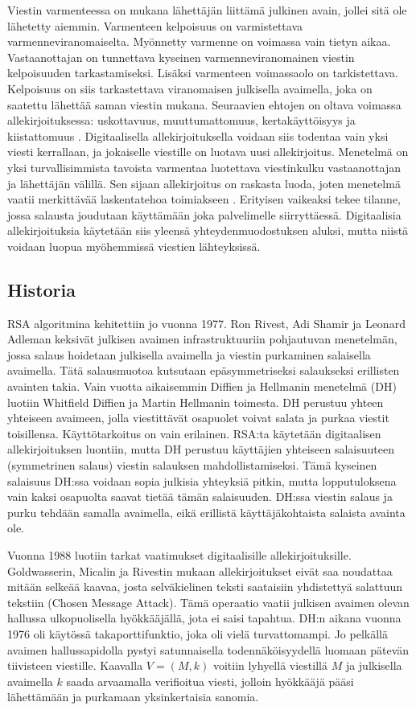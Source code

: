 \documentclass[finnish]{tktltiki2}
\theoremstyle{definition}
\theoremstyle{remark}
\begin{document}
Viestin varmenteessa on mukana lähettäjän liittämä julkinen avain, jollei sitä ole lähetetty aiemmin. Varmenteen kelpoisuus on varmistettava varmenneviranomaiselta. Myönnetty varmenne on voimassa vain tietyn aikaa. Vastaanottajan on tunnettava kyseinen varmenneviranomainen viestin kelpoisuuden tarkastamiseksi. Lisäksi varmenteen voimassaolo on tarkistettava. Kelpoisuus on siis tarkastettava viranomaisen julkisella avaimella, joka on saatettu lähettää saman viestin mukana. Seuraavien ehtojen on oltava voimassa allekirjoituksessa: uskottavuus, muuttumattomuus, kertakäyttöisyys ja kiistattomuus \cite{e-c}. Digitaalisella allekirjoituksella voidaan siis todentaa vain yksi viesti kerrallaan, ja jokaiselle viestille on luotava uusi allekirjoitus. Menetelmä on yksi turvallisimmista tavoista varmentaa luotettava viestinkulku vastaanottajan ja lähettäjän välillä. Sen sijaan allekirjoitus on raskasta luoda, joten menetelmä vaatii merkittävää laskentatehoa toimiakseen \cite{proxy}. Erityisen vaikeaksi tekee tilanne, jossa salausta joudutaan käyttämään joka palvelimelle siirryttäessä. Digitaalisia allekirjoituksia käytetään siis yleensä yhteydenmuodostuksen aluksi, mutta niistä voidaan luopua myöhemmissä viestien lähteyksissä.

\subsection{Historia}

RSA algoritmina kehitettiin jo vuonna 1977. Ron Rivest, Adi Shamir ja Leonard Adleman \cite{siam} keksivät julkisen avaimen infrastruktuuriin pohjautuvan menetelmän, jossa salaus hoidetaan julkisella avaimella ja viestin purkaminen salaisella avaimella. Tätä salausmuotoa kutsutaan epäsymmetriseksi salaukseksi erillisten avainten takia. Vain vuotta aikaisemmin Diffien ja Hellmanin menetelmä (DH) luotiin Whitfield Diffien ja Martin Hellmanin toimesta. DH perustuu yhteen yhteiseen avaimeen, jolla viestittävät osapuolet voivat salata ja purkaa viestit toisillensa. Käyttötarkoitus on vain erilainen. RSA:ta käytetään digitaalisen allekirjoituksen luontiin, mutta DH perustuu käyttäjien yhteiseen salaisuuteen (symmetrinen salaus) viestin salauksen mahdollistamiseksi. Tämä kyseinen salaisuus DH:ssa voidaan sopia julkisia yhteyksiä pitkin, mutta lopputuloksena vain kaksi osapuolta saavat tietää tämän salaisuuden. DH:ssa viestin salaus ja purku tehdään samalla avaimella, eikä erillistä käyttäjäkohtaista salaista avainta ole.

Vuonna 1988 luotiin tarkat vaatimukset digitaalisille allekirjoituksille. Goldwasserin, Micalin ja Rivestin \cite{siam} mukaan allekirjoitukset eivät saa noudattaa mitään selkeää kaavaa, josta selväkielinen teksti saataisiin yhdistettyä salattuun tekstiin (Chosen Message Attack). Tämä operaatio vaatii julkisen avaimen olevan hallussa ulkopuolisella hyökkääjällä, jota ei saisi tapahtua. DH:n aikana vuonna 1976 oli käytössä takaporttifunktio, joka oli vielä turvattomampi. Jo pelkällä avaimen hallussapidolla pystyi satunnaisella todennäköisyydellä luomaan pätevän tiivisteen viestille. Kaavalla $V =(M,k)$ voitiin lyhyellä viestillä $M$ ja julkisella avaimella $k$ saada arvaamalla verifioitua viesti, jolloin hyökkääjä pääsi lähettämään ja purkamaan yksinkertaisia sanomia.
\end{document}
